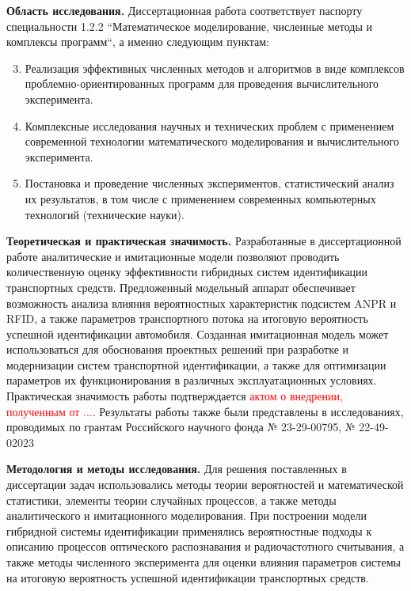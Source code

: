 \documentclass[12pt]{article}
\theoremstyle{definition}
\begin{document}
\textbf{Область исследования.} Диссертационная работа соответствует паспорту специальности 1.2.2 ``Математическое моделирование, численные методы и комплексы программ``, а именно следующим пунктам:

\begin{enumerate}[label=п.\arabic*., leftmargin=*]
    \setcounter{enumi}{2}
    \item Реализация эффективных численных методов и алгоритмов в виде комплексов проблемно-ориентированных программ для проведения вычислительного эксперимента.
    \setcounter{enumi}{7}
    \item Комплексные исследования научных и технических проблем с применением современной технологии математического моделирования и вычислительного эксперимента.
    \setcounter{enumi}{8}
    \item Постановка и проведение численных экспериментов, статистический анализ их результатов, в том числе с применением современных компьютерных технологий (технические науки).
\end{enumerate}

\textbf{Теоретическая и практическая значимость.} Разработанные в диссертационной работе аналитические и имитационные модели позволяют проводить количественную оценку эффективности гибридных систем идентификации транспортных средств. Предложенный модельный аппарат обеспечивает возможность анализа влияния вероятностных характеристик подсистем ANPR и RFID, а также параметров транспортного потока на итоговую вероятность успешной идентификации автомобиля. Созданная имитационная модель может использоваться для обоснования проектных решений при разработке и модернизации систем транспортной идентификации, а также для оптимизации параметров их функционирования в различных эксплуатационных условиях. Практическая значимость работы подтверждается \textcolor{red}{актом о внедрении, полученным от ...}. Результаты работы также были представлены в исследованиях, проводимых по грантам Российского научного фонда № 23-29-00795, № 22-49-02023

\textbf{Методология и методы исследования.} Для решения поставленных в диссертации задач использовались методы теории вероятностей и математической статистики, элементы теории случайных процессов, а также методы аналитического и имитационного моделирования. При построении модели гибридной системы идентификации применялись вероятностные подходы к описанию процессов оптического распознавания и радиочастотного считывания, а также методы численного эксперимента для оценки влияния параметров системы на итоговую вероятность успешной идентификации транспортных средств.
\end{document}
